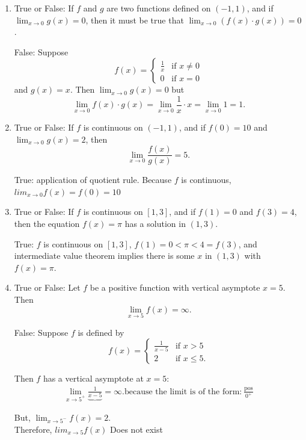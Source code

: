 \documentclass[nooutcomes, handout]{ximera}
\begin{document}
\begin{problem}
	\begin{enumerate}
	\item  True or False: If $f$ and $g$ are two functions defined on $(-1, 1)$, and if $\displaystyle \lim_{x \to 0} g(x) = 0$, then it must be true that $\displaystyle \lim_{x \to 0} (f(x) \cdot g(x)) = 0$.
  \begin{freeResponse}
    False: Suppose 
    \[
      f(x) =
      \begin{cases}
        \frac{1}{x} & \mbox{if $x \ne 0$}\\
        0 & \mbox{if $x = 0$}
      \end{cases}
    \]
    and $g(x) = x$.
    Then $\lim_{x \to 0} g(x) = 0$ but
    \[
      \lim_{x \to 0} f(x) \cdot g(x) = \lim_{x \to 0} \frac{1}{x} \cdot x = \lim_{x \to 0} 1 = 1.
    \]
  \end{freeResponse}

  \item True or False: If $f$ is continuous on $(-1, 1)$, and if $f(0) = 10$ and $\displaystyle \lim_{x \to 0} g(x) = 2$, then
  \[
    \lim_{x \to 0} \frac{f(x)}{g(x)} = 5.
  \]
  \begin{freeResponse}
    True: application of quotient rule.  Because $f$ is continuous, $lim_{x \to 0} f(x)=f(0)=10$
  \end{freeResponse}

	\item  True or False: If $f$ is continuous on $[1, 3]$, and if $f(1) = 0$ and $f(3) = 4$, then the equation $f(x) = \pi$ has a solution in $(1, 3)$.
  \begin{freeResponse}
    True: $f$ is continuous on $[1, 3]$, $f(1) = 0 < \pi < 4 = f(3)$, and intermediate value theorem implies there is some $x$ in $(1, 3)$ with $f(x) = \pi$.
  \end{freeResponse}

  \item True or False: Let $f$ be a positive function with vertical asymptote $x = 5$. Then
  \[
    \lim_{x \to 5} f(x) = \infty.
  \]
  \begin{freeResponse}
    False: Suppose $f$ is defined by
    \[
      f(x) =
      \begin{cases}
        \frac{1}{x - 5} & \mbox{if $x > 5$}\\
        2 & \mbox{if $x \le 5$}.
      \end{cases}
    \]
    
    Then $f$ has a vertical asymptote at $x = 5$:
    \begin{align*}
      \lim_{x \to 5^+} \underbrace{\frac{1}{x-5}} = \infty. \text{because the limit is of the form:}\ \frac{\text{pos}}{0^+}
    \end{align*}

    But, $\displaystyle \lim_{x \to 5^-} f(x) = 2$.\\
	Therefore, $lim_{x \to 5} f(x)$ Does not exist

  \end{freeResponse}
\end{enumerate}
\end{problem}
\end{document}
